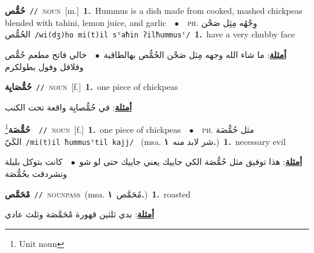 \documentclass[10pt,a4paper,twoside]{article} %
\begin{document}
\begin{multicols}{2}
{\setlength\topsep{0pt}\textbf{\foreignlanguage{arabic}{حُمُّص}}\ {\color{gray}\texttt{//}\color{black}}\ \textsc{noun}\ [m.]\ \textbf{1.}~Hummus is a dish made from cooked, mashed chickpeas blended with tahini, lemon juice, and garlic\ \ $\bullet$\ \ \textsc{ph.} \color{gray} \foreignlanguage{arabic}{وِجْهُه مِثِل صَحْن الحُمُّص}\color{black}\ {\color{gray}\texttt{/{\sffamily wi(dʒ)ho mi(t)il sˤaħin ʔilħummusˤ}/}\color{black}}\ \textbf{1.}~have a very chubby face\  \begin{flushright}\color{gray}\foreignlanguage{arabic}{\textbf{\underline{\foreignlanguage{arabic}{أمثلة}}}: ما شاء الله وجهه مِثل صَحْن الحُمُّص بهالطاقية\ $\bullet$\ \  خالي فاتح مطعم حُمُّص وفلافل وفول بطولكرم}\end{flushright}\color{black}} \vspace{2mm}

{\setlength\topsep{0pt}\textbf{\foreignlanguage{arabic}{حُمُّصَايِة}}\ {\color{gray}\texttt{//}\color{black}}\ \textsc{noun}\ [f.]\ \textbf{1.}~one piece of chickpeas\  \begin{flushright}\color{gray}\foreignlanguage{arabic}{\textbf{\underline{\foreignlanguage{arabic}{أمثلة}}}: في حُمُّصايِة واقعة تحت الكنب}\end{flushright}\color{black}} \vspace{2mm}

{\setlength\topsep{0pt}\textbf{\foreignlanguage{arabic}{حُمُّصَة}}\footnote{Unit noun}\ \ {\color{gray}\texttt{//}\color{black}}\ \textsc{noun}\ [f.]\ \textbf{1.}~one piece of chickpeas\ \ $\bullet$\ \ \textsc{ph.} \color{gray} \foreignlanguage{arabic}{مثل حُمُّصَة الكَيّ}\color{black}\ {\color{gray}\texttt{/{\sffamily mi(t)il ħummusˤtil kajj}/}\color{black}}\ \color{gray} (msa. \foreignlanguage{arabic}{شر لابد منه}~\foreignlanguage{arabic}{\textbf{١.}})\color{black}\ \textbf{1.}~necessary evil\  \begin{flushright}\color{gray}\foreignlanguage{arabic}{\textbf{\underline{\foreignlanguage{arabic}{أمثلة}}}: هذا توفيق مثل حُمُّصَة الكي جاييك يعني جاييك حتى لو شو\ $\bullet$\ \  كانت بتوكل بليلة وتشردقت بحُمُّصَة}\end{flushright}\color{black}} \vspace{2mm}

{\setlength\topsep{0pt}\textbf{\foreignlanguage{arabic}{مْحَمَّص}}\ {\color{gray}\texttt{//}\color{black}}\ \textsc{noun\textunderscore pass}\ \color{gray}(msa. \foreignlanguage{arabic}{مُحَمَّص}~\foreignlanguage{arabic}{\textbf{١.}})\color{black}\ \textbf{1.}~roasted\  \begin{flushright}\color{gray}\foreignlanguage{arabic}{\textbf{\underline{\foreignlanguage{arabic}{أمثلة}}}: بدي ثلثين قهورة مْحَمَّصَة وثلث عادي}\end{flushright}\color{black}} \vspace{2mm}


\end{multicols}
\end{document}
